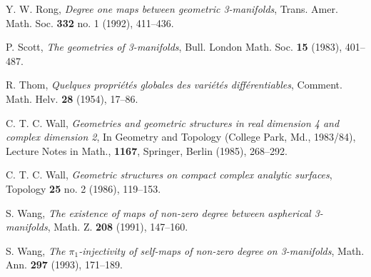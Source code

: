 \documentclass[12pt]{amsart}
\theoremstyle{remark}
\begin{document}
\begin{thebibliography}{10}
Y. W. Rong, {\em Degree one maps between geometric 3-manifolds}, Trans. Amer. Math. Soc. {\bf 332} no. 1 (1992), 411--436.

P. Scott, {\em The geometries of 3-manifolds}, Bull. London Math. Soc. {\bf 15} (1983), 401--487.

R. Thom, {\em Quelques propri\'et\'es globales des vari\'et\'es diff\'erentiables}, Comment. Math. Helv. {\bf 28} (1954), 17--86.

C. T. C. Wall, {\em Geometries and geometric structures in real dimension 4 and complex dimension 2}, In Geometry and Topology (College Park, Md., 1983/84), Lecture Notes in Math., {\bf 1167}, Springer, Berlin (1985), 268--292.

C. T. C. Wall, {\em Geometric structures on compact complex analytic surfaces}, Topology {\bf 25} no. 2 (1986), 119--153.

S. Wang, {\em The existence of maps of non-zero degree between aspherical 3-manifolds}, Math. Z. {\bf 208} (1991), 147--160.

S. Wang, {\em The $\pi_1$-injectivity of self-maps of non-zero degree on 3-manifolds}, Math. Ann. {\bf 297} (1993), 171--189.

\end{thebibliography}
\end{document}
